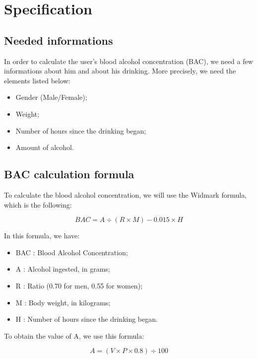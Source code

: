 \section{Specification}
\label{sec:spec}

\subsection{Needed informations}
\label{ssec:info} 

In order to calculate the user's blood alcohol concentration (BAC), we need a few informations about him and about his drinking. More precisely, we need the elements listed below:

\begin{itemize}[noitemsep]
\item Gender (Male/Female);
\item Weight;
\item Number of hours since the drinking began; 
\item Amount of alcohol.
\end{itemize}

\subsection{BAC calculation formula}
\label{ssec:formula}

To calculate the blood alcohol concentration, we will use the Widmark formula, which is the following:

\begin{equation}
   BAC = A \div (R \times M) - 0.015 \times H
\end{equation}
   
In this formula, we have:

\begin{itemize}[noitemsep]
\item BAC : Blood Alcohol Concentration;
\item A : Alcohol ingested, in grams;
\item R : Ratio (0.70 for men, 0.55 for women);
\item M : Body weight, in kilograms;
\item H : Number of hours since the drinking began.
\end{itemize}

To obtain the value of A, we use this formula:

\begin{equation}
   A = (V \times P \times 0.8) \div 100
\end{equation}

